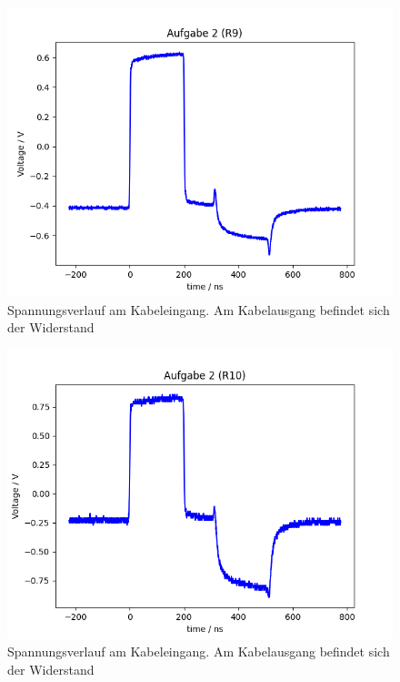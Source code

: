 \documentclass{article}
\begin{document}
\begin{figure}[H]
\centering
\caption{Spannungsverlauf am Kabeleingang. Am Kabelausgang befindet sich der Widerstand }
\label{fig:task2_R9}
\includegraphics[scale=0.6]{bilder/task2/task2_R9.png}
\end{figure}





\begin{figure}[H]
\centering
\caption{Spannungsverlauf am Kabeleingang. Am Kabelausgang befindet sich der Widerstand }
\label{fig:task2_R10}
\includegraphics[scale=0.6]{bilder/task2/task2_R10.png}
\end{figure}
\end{document}
